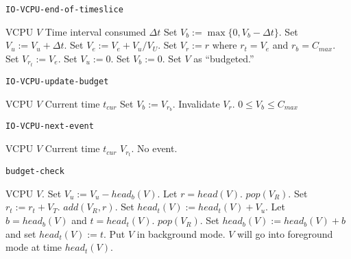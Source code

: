 \documentclass{article}
\begin{document}
\begin{algorithm}
  \caption{\tt IO-VCPU-end-of-timeslice}\label{alg:iovcpu_eot}
  \begin{algorithmic}[1]
    \REQUIRE VCPU $V$
    \REQUIRE Time interval consumed $\Delta t$
    \STATE Set $V_b:=\max\{0,V_b-\Delta t\}$.
    \STATE Set $V_u:=V_u+\Delta t$.
    \STATE Set $V_e:=V_e+V_u/V_U$.
    \STATE Set $V_r:=r$ where $r_t=V_e$ and $r_b=C_{max}$.
    \ELSE
    \STATE Set $V_{r_t}:=V_e$.
    \ENDIF
    \STATE Set $V_u:=0$.
    \STATE Set $V_b:=0$.
    \STATE Set $V$ as \NOT ``budgeted.''
    \ENDIF
    \ENDIF
  \end{algorithmic}
\end{algorithm}

\begin{algorithm}
  \caption{\tt IO-VCPU-update-budget}\label{alg:iovcpu_upbudg}
  \begin{algorithmic}[1]
    \REQUIRE VCPU $V$
    \REQUIRE Current time $t_{cur}$
    \STATE Set $V_b:=V_{r_b}$.
    \STATE Invalidate $V_r$.
    \ENDIF
    \ENSURE $0\leq V_b\leq C_{max}$
  \end{algorithmic}
\end{algorithm}

\begin{algorithm}
  \caption{\tt IO-VCPU-next-event}\label{alg:iovcpu_nextevent}
  \begin{algorithmic}[1]
    \REQUIRE VCPU $V$
    \REQUIRE Current time $t_{cur}$
    \RETURN $V_{r_t}$.
    \ELSE
    \RETURN No event.
    \ENDIF
  \end{algorithmic}
\end{algorithm}

\begin{algorithm}
  \caption{\tt budget-check}
  \begin{algorithmic}[1]
    \REQUIRE VCPU $V$.
    \STATE Set $V_u:=V_u-head_b(V)$.
    \STATE Let $r=head(V)$.
    \STATE $pop(V_R)$.
    \STATE Set $r_t:=r_t+V_T$.
    \STATE $add(V_R,r)$.
    \ENDWHILE
    \STATE Set $head_t(V) := head_t(V) + V_u$.
    \STATE Let $b=head_b(V)$ and $t=head_t(V)$.
    \STATE $pop(V_R)$.
    \STATE Set $head_b(V):=head_b(V)+b$ and set $head_t(V):=t$.
    \ENDIF
    \ENDIF
    \STATE Put $V$ in background mode.
    \STATE $V$ will go into foreground mode at time $head_t(V)$.
    \ENDIF
    \ENDIF
    \ENDIF
  \end{algorithmic}
\end{algorithm}
\end{document}
